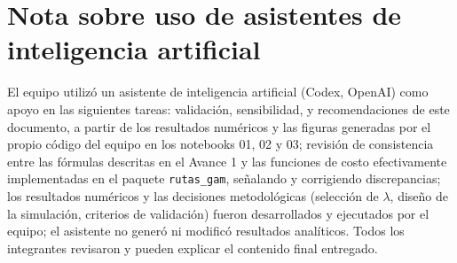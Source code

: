 \documentclass[11pt]{article}
\numberwithin{equation}{section}
\begin{document}
\section*{Nota sobre uso de asistentes de inteligencia artificial}


El equipo utilizó un asistente de inteligencia artificial (Codex, OpenAI) como apoyo en las siguientes tareas: validación, sensibilidad, y recomendaciones de este documento, a partir de los resultados numéricos y las figuras generadas por el propio código del equipo en los notebooks 01, 02 y 03; revisión de consistencia entre las fórmulas descritas en el Avance 1 y las funciones de costo efectivamente implementadas en el paquete \texttt{rutas\_gam}, señalando y corrigiendo discrepancias; los resultados numéricos y las decisiones metodológicas (selección de $\lambda$, diseño de la simulación, criterios de validación) fueron desarrollados y ejecutados por el equipo; el asistente no generó ni modificó resultados analíticos. Todos los integrantes revisaron y pueden explicar el contenido final entregado.
\end{document}
